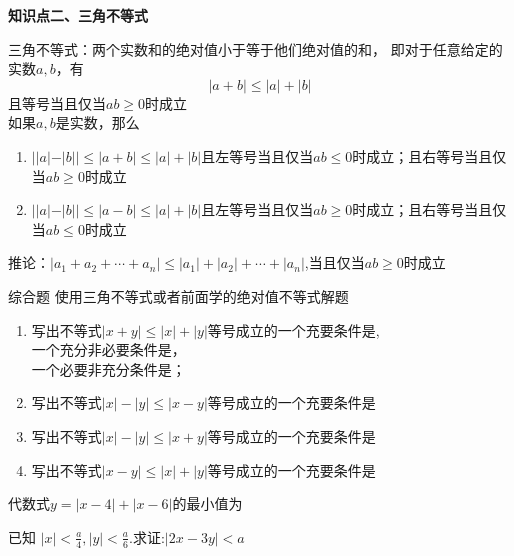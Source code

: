 \begin{formal}
    {\large \textbf{知识点二、三角不等式}}
\end{formal}
三角不等式：两个实数和的绝对值小于等于他们绝对值的和，
即对于任意给定的实数$a,b$，有$$|a+b|\le|a|+|b|$$且等号当且仅当$ab\ge0$时成立\\
如果$a,b$是实数，那么

\begin{enumerate}
    \item $||a|-|b||\le|a+b|\le |a|+|b|$且左等号当且仅当$ab\le0$时成立；且右等号当且仅当$ab\ge0$时成立
    \item $||a|-|b||\le|a-b|\le |a|+|b|$且左等号当且仅当$ab\ge0$时成立；且右等号当且仅当$ab\le0$时成立
\end{enumerate}

推论：$|a_1+a_2+\cdots+a_n|\le |a_1|+|a_2|+\cdots+|a_n|$,当且仅当$ab\ge0$时成立


\begin{tcolorbox} 
    \centering
    综合题
    \tcblower %
    使用三角不等式或者前面学的绝对值不等式解题
\end{tcolorbox}


\par
\begin{problem}
    \begin{enumerate}
        \item 写出不等式$|x+y|\le|x|+|y|$等号成立的一个充要条件是,\\
        一个充分非必要条件是，\\
        一个必要非充分条件是；
        \item 写出不等式$|x|-|y|\le|x-y|$等号成立的一个充要条件是
        \item 写出不等式$|x|-|y|\le|x+y|$等号成立的一个充要条件是
        \item 写出不等式$|x-y|\le|x|+|y|$等号成立的一个充要条件是
    \end{enumerate}
\end{problem}

\par
\begin{problem}
    代数式$y=|x-4|+|x-6|$的最小值为
\end{problem}

\par
\begin{problem}
    已知 $\displaystyle |x|<\frac{a}{4},|y|<\frac{a}{6}.$求证:$|2x-3y|<a$
\end{problem}

